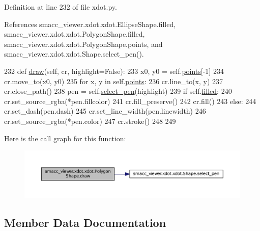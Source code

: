 Definition at line 232 of file xdot.\+py.



References smacc\+\_\+viewer.\+xdot.\+xdot.\+Ellipse\+Shape.\+filled, smacc\+\_\+viewer.\+xdot.\+xdot.\+Polygon\+Shape.\+filled, smacc\+\_\+viewer.\+xdot.\+xdot.\+Polygon\+Shape.\+points, and smacc\+\_\+viewer.\+xdot.\+xdot.\+Shape.\+select\+\_\+pen().


\begin{DoxyCode}
232     \textcolor{keyword}{def }\hyperlink{classsmacc__viewer_1_1xdot_1_1xdot_1_1PolygonShape_abb66a41371ac48799c85fdd4cca55e4e}{draw}(self, cr, highlight=False):
233         x0, y0 = self.\hyperlink{classsmacc__viewer_1_1xdot_1_1xdot_1_1PolygonShape_a07211b47e692cdcc89d412db44fec2a7}{points}[-1]
234         cr.move\_to(x0, y0)
235         \textcolor{keywordflow}{for} x, y \textcolor{keywordflow}{in} self.\hyperlink{classsmacc__viewer_1_1xdot_1_1xdot_1_1PolygonShape_a07211b47e692cdcc89d412db44fec2a7}{points}:
236             cr.line\_to(x, y)
237         cr.close\_path()
238         pen = self.\hyperlink{classsmacc__viewer_1_1xdot_1_1xdot_1_1Shape_a447a62283d0acd07b7bca2106d2de6e6}{select\_pen}(highlight)
239         \textcolor{keywordflow}{if} self.\hyperlink{classsmacc__viewer_1_1xdot_1_1xdot_1_1PolygonShape_ac9db183c34593ef8b830cf2f06458720}{filled}:
240             cr.set\_source\_rgba(*pen.fillcolor)
241             cr.fill\_preserve()
242             cr.fill()
243         \textcolor{keywordflow}{else}:
244             cr.set\_dash(pen.dash)
245             cr.set\_line\_width(pen.linewidth)
246             cr.set\_source\_rgba(*pen.color)
247             cr.stroke()
248 
249 
\end{DoxyCode}


Here is the call graph for this function\+:
\nopagebreak
\begin{figure}[H]
\begin{center}
\leavevmode
\includegraphics[width=350pt]{classsmacc__viewer_1_1xdot_1_1xdot_1_1PolygonShape_abb66a41371ac48799c85fdd4cca55e4e_cgraph}
\end{center}
\end{figure}




\subsection{Member Data Documentation}
